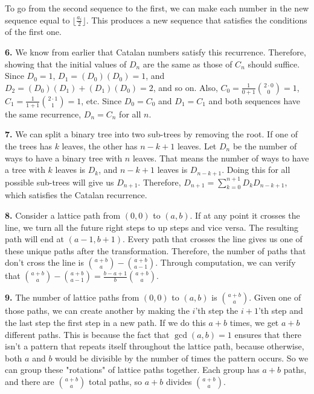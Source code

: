 \documentclass{article}
\begin{document}
To go from the second sequence to the first, we can make each number in the new sequence equal to $\lfloor \frac{a_i}{2} \rfloor$. This produces a new sequence that satisfies the conditions of the first one.
\newline

\textbf{6.} We know from earlier that Catalan numbers satisfy this recurrence. Therefore, showing that the initial values of $D_n$ are the same as those of $C_n$ should suffice. Since $D_0 = 1$, $D_1 = (D_0)(D_0) = 1$, and $D_2 = (D_0)(D_1) + (D_1)(D_0) = 2$, and so on. Also, $C_0 = \frac{1}{0 + 1}{{2\cdot 0}\choose 0} = 1$, $C_1 = \frac{1}{1 + 1}{{2\cdot 1}\choose 1} = 1$, etc. Since $D_0 = C_0$ and $D_1 = C_1$ and both sequences have the same recurrence, $D_n = C_n$ for all $n$.
\newline

\textbf{7.} We can split a binary tree into two sub-trees by removing the root. If one of the trees has $k$ leaves, the other has $n - k + 1$ leaves. Let $D_n$ be the number of ways to have a binary tree with $n$ leaves. That means the number of ways to have a tree with $k$ leaves is $D_k$, and $n - k + 1$ leaves is $D_{n - k + 1}$. Doing this for all possible sub-trees will give us $D_{n + 1}$. Therefore, $D_{n + 1} = \sum_{k = 0}^{n + 1} D_kD_{n - k + 1}$, which satisfies the Catalan recurrence.
\newline

\textbf{8.} Consider a lattice path from $(0, 0)$ to $(a, b)$. If at any point it crosses the line, we turn all the future right steps to up steps and vice versa. The resulting path will end at $(a - 1, b + 1)$. Every path that crosses the line gives us one of these unique paths after the transformation. Therefore, the number of paths that don't cross the line is ${{a + b}\choose a} - {{a + b}\choose {a - 1}}$. Through computation, we can verify that ${{a + b}\choose a} - {{a + b}\choose {a - 1}} = \frac{b - a + 1}{b}{{a + b}\choose a}$.
\newline

\textbf{9.} The number of lattice paths from $(0, 0)$ to $(a, b)$ is ${a + b}\choose a$. Given one of those paths, we can create another by making the $i$'th step the $i + 1$'th step and the last step the first step in a new path. If we do this $a + b$ times, we get $a + b$ different paths. This is because the fact that $\gcd(a, b) = 1$ ensures that there isn't a pattern that repeats itself throughout the lattice path, because otherwise, both $a$ and $b$ would be divisible by the number of times the pattern occurs. So we can group these "rotations" of lattice paths together. Each group has $a + b$ paths, and there are ${a + b}\choose a$ total paths, so $a + b$ divides ${a + b}\choose a$.
\end{document}
